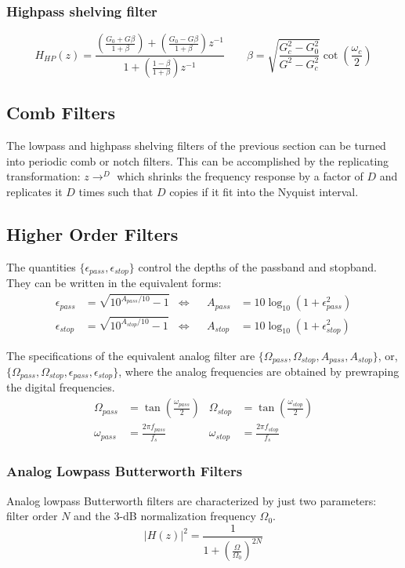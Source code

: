 \subsubsection{Highpass shelving filter}
\[
	H_{HP}(z) = 
	\frac{
		\left(\frac{G_0 + G\beta}{1+\beta}\right) + 
		\left(\frac{G_0-G\beta}{1+\beta}\right)z^{-1}
	}{
		1 +
		\left(\frac{1-\beta}{1+\beta}\right)z^{-1}
	}
	\qquad
	\beta =
		\sqrt{\frac{G_c^2-G_0^2}{G^2-G_c^2}}
		\cot\left(\frac{\omega_c}{2}\right)
\]

\subsection{Comb Filters}
The lowpass and highpass shelving filters of the previous section can be turned into periodic comb or notch filters.
This can be accomplished by the replicating transformation: $z \rightarrow ^{D}$ which shrinks the frequency response by a factor of $D$ and replicates it $D$ times such that $D$ copies if it fit into the Nyquist interval.

\subsection{Higher Order Filters}
The quantities $\{\epsilon_{pass}, \epsilon_{stop}\}$ control the depths of the passband and stopband.
They can be written in the equivalent forms:
\begin{align*}
	\epsilon_{pass} &= \sqrt{10^{A_{pass}/10} - 1} & \Longleftrightarrow &&
	A_{pass}&= 10\log_{10}(1 + \epsilon_{pass}^2) \\
	\epsilon_{stop} &= \sqrt{10^{A_{stop}/10} - 1} & \Longleftrightarrow &&
	A_{stop}&= 10\log_{10}(1 + \epsilon_{stop}^2)
\end{align*}

The specifications of the equivalent analog filter are $\{\Omega_{pass}, \Omega_{stop}, A_{pass}, A_{stop} \}$, or, $\{\Omega_{pass}, \Omega_{stop}, \epsilon_{pass}, \epsilon_{stop} \}$, where the analog frequencies are obtained by prewraping the digital frequencies.
\begin{align*}
	\Omega_{pass} &= \tan\left(\frac{\omega_{pass}}{2}\right) & 
	\Omega_{stop} &= \tan\left(\frac{\omega_{stop}}{2}\right) \\
	\omega_{pass} &= \frac{2\pi f_{pass}}{f_s} &
	\omega_{stop} &= \frac{2\pi f_{stop}}{f_s} 
\end{align*}

\subsubsection{Analog Lowpass Butterworth Filters}
Analog lowpass Butterworth filters are characterized by just two parameters:
filter order $N$ and the 3-dB normalization frequency $\Omega_0$.
\[
	\left|H(z)\right|^2 =
		\frac{1}{1 + \left(\frac{\Omega}{\Omega_0}\right)^{2N}}
\]

